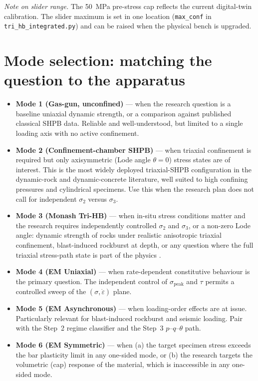 \documentclass[11pt,a4paper,openany]{book}
\providecommand{\SI}[2]{\qty{#1}{#2}}
\theoremstyle{handbook}
\newcommand{\sig}{\sigma}
\newcommand{\eps}{\varepsilon}
\newcommand{\epsdot}{\dot\eps}
\newcommand{\sigpeak}{\sig_{\text{peak}}}
\begin{document}
\noindent\textit{Note on slider range.} The \SI{50}{MPa} pre-stress cap
reflects the current digital-twin calibration. The slider maximum is set in
one location (\texttt{max\_conf} in \texttt{tri\_hb\_integrated.py}) and can
be raised when the physical bench is upgraded.

\section{Mode selection: matching the question to the apparatus}

\begin{itemize}[leftmargin=*,itemsep=3pt]
  \item \textbf{Mode 1 (Gas-gun, unconfined)} --- when the research question
        is a baseline uniaxial dynamic strength, or a comparison against
        published classical SHPB data. Reliable and well-understood, but
        limited to a single loading axis with no active confinement.
  \item \textbf{Mode 2 (Confinement-chamber SHPB)} --- when triaxial
        confinement is required but only axisymmetric (Lode angle
        $\theta=0$) stress states are of interest. This is the most
        widely deployed triaxial-SHPB configuration in the dynamic-rock
        and dynamic-concrete literature, well suited to high confining
        pressures and cylindrical specimens. Use this when the research
        plan does not call for independent $\sig_2$ versus $\sig_3$.
  \item \textbf{Mode 3 (Monash Tri-HB)} --- when in-situ stress conditions
        matter and the research requires independently controlled $\sig_2$
        and $\sig_3$, or a non-zero Lode angle: dynamic strength of rocks
        under realistic anisotropic triaxial confinement, blast-induced
        rockburst at depth, or any question where the full triaxial
        stress-path state is part of the physics
        \cite{Liu2019,Zhang2019Tri}.
  \item \textbf{Mode 4 (EM Uniaxial)} --- when rate-dependent constitutive
        behaviour is the primary question. The independent control of
        $\sigpeak$ and $\tau$ permits a controlled sweep of the
        $(\sig,\epsdot)$ plane.
  \item \textbf{Mode 5 (EM Asynchronous)} --- when loading-order effects
        are at issue. Particularly relevant for blast-induced rockburst
        and seismic loading. Pair with the Step~2 regime classifier and
        the Step~3 $p$--$q$--$\theta$ path.
  \item \textbf{Mode 6 (EM Symmetric)} --- when (a) the target specimen
        stress exceeds the bar plasticity limit in any one-sided mode, or
        (b) the research targets the volumetric (cap) response of the
        material, which is inaccessible in any one-sided mode.
\end{itemize}
\end{document}
